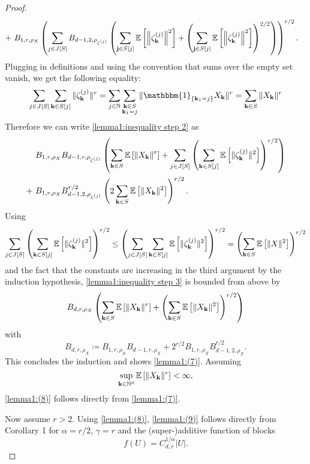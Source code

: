 \begin{proof}
\begin{equation}
\begin{split}
        + & \ B_{1, r, \rho_X} \left( \sum\limits_{j \in J[S]} B_{d-1, 2, \rho_{\zeta^{(j)}}} \left( \sum\limits_{\mathbf{j} \in S[j]} \mathbb{E}\left[\left\| \zeta_\mathbf{k}^{(j)} \right\|^2\right] + \left( \sum\limits_{\mathbf{j} \in S[j]} \mathbb{E}\left[\left\| \zeta_\mathbf{k}^{(j)} \right\|^2\right] \right)^{2/2} \right) \right)^{r/2}.
    \end{split} \end{equation}
    Plugging in definitions and using the convention that sums over the empty set vanish, we get the following equality:
    \[ \sum\limits_{j \in J[S]} \sum\limits_{\mathbf{k} \in S[j]} \| \zeta_\mathbf{k}^{(j)} \|^r = \sum\limits_{j \in \NN} \sum\limits_{\substack{\mathbf{k} \in S \\ \mathbf{k}_1 = j}} \| \mathbbm{1}_{\{\mathbf{k}_1 = j \}} X_\mathbf{k} \|^r = \sum\limits_{\mathbf{k} \in S} \| X_\mathbf{k} \|^r \]
    Therefore we can write \eqref{lemma1:inequality step 2} as
    \begin{equation} \label{lemma1:inequality step 3} \begin{split}
        & \ B_{1, r, \rho_X} B_{d-1, r, \rho_{\zeta^{(j)}}} \left( \sum\limits_{\mathbf{k} \in S} \mathbb{E}\left[\|X_\mathbf{k}\|^r\right] + \sum\limits_{j \in J[S]} \left( \sum\limits_{\mathbf{k} \in S[j]} \mathbb{E}\left[\| \zeta_\mathbf{k}^{(j)} \|^2\right] \right)^{r/2} \right) \\
        + & \ B_{1, r, \rho_X} B_{d-1, 2, \rho_{\zeta^{(j)}}}^{r/2} \left(2 \sum\limits_{\mathbf{k} \in S} \mathbb{E}\left[\|X_\mathbf{k}\|^2\right] \right)^{r/2}.
    \end{split} \end{equation}
    Using
    \[ \sum\limits_{j \in J[S]} \left( \sum\limits_{\mathbf{k} \in S[j]}\mathbb{E}\left[\| \zeta_\mathbf{k}^{(j)} \|^2\right] \right)^{r/2} \leq \left( \sum\limits_{j \in J[S]} \sum\limits_{\mathbf{k} \in S[j]}\mathbb{E}\left[\| \zeta_\mathbf{k}^{(j)} \|^2\right] \right)^{r/2} = \left( \sum\limits_{\mathbf{k} \in S}\mathbb{E}\left[\| X \|^2\right] \right)^{r/2} \]
    and the fact that the constants are increasing in the third argument by the induction hypothesis, \eqref{lemma1:inequality step 3} is bounded from above by
    \begin{align*}
        B_{d, r, \rho_X} \left(\sum\limits_{\mathbf{k} \in S} \mathbb{E}\left[\|X_\mathbf{k}\|^r\right] + \left( \sum\limits_{\mathbf{k} \in S} \mathbb{E}\left[\|X_\mathbf{k}\|^2\right] \right)^{r/2} \right)
    \end{align*}
    with
    \[ B_{d, r, \rho_X} \coloneqq B_{1, r, \rho_X} B_{d-1, r, \rho_X} + 2^{r/2} B_{1, r, \rho_X} B_{d-1, 2, \rho_X}^{r/2}. \]
    This concludes the induction and shows \eqref{lemma1:(7)}. Assuming 
    \[ \sup\limits_{\mathbf{k} \in \mathbb{N} ^d} \mathbb{E}\left[\| X_\mathbf{k} \|^r\right] < \infty, \]
    \eqref{lemma1:(8)} follows directly from \eqref{lemma1:(7)}.

    Now assume $r > 2$. Using \eqref{lemma1:(8)}, \eqref{lemma1:(9)} follows directly from \cite{[37]moricz1983general} Corollary 1 for $\alpha = r/2$, $\gamma = r$ and the (super-)additive function of blocks
    \[ f(U) = C_{d, r}^{1/\alpha} |U|. \]
\end{proof}


